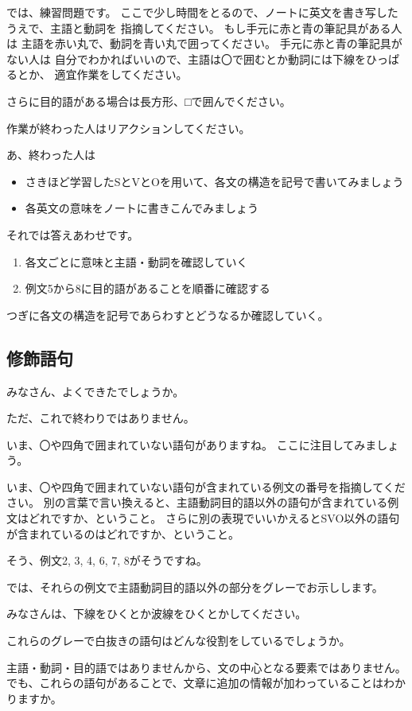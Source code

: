 \documentclass[book,jafontscale=0.9247]{jlreq}
\begin{document}
では、練習問題です。
ここで少し時間をとるので、ノートに英文を書き写したうえで、主語と動詞を
指摘してください。
もし手元に赤と青の筆記具がある人は
主語を赤い丸で、動詞を青い丸で囲ってください。
手元に赤と青の筆記具がない人は
自分でわかればいいので、主語は〇で囲むとか動詞には下線をひっぱるとか、
適宜作業をしてください。

さらに目的語がある場合は長方形、□で囲んでください。

作業が終わった人はリアクションしてください。


あ、終わった人は
\begin{itemize}
 \item さきほど学習したSとVとOを用いて、各文の構造を記号で書いてみましょう
 \item 各英文の意味をノートに書きこんでみましょう
\end{itemize}


それでは答えあわせです。

\begin{enumerate}
 \item 各文ごとに意味と主語・動詞を確認していく
 \item 例文5から8に目的語があることを順番に確認する
\end{enumerate}

つぎに各文の構造を記号であらわすとどうなるか確認していく。

\subsection{修飾語句}
みなさん、よくできたでしょうか。

ただ、これで終わりではありません。

いま、〇や四角で囲まれていない語句がありますね。
ここに注目してみましょう。

いま、〇や四角で囲まれていない語句が含まれている例文の番号を指摘してください。
別の言葉で言い換えると、主語動詞目的語以外の語句が含まれている例文はどれですか、ということ。
さらに別の表現でいいかえるとSVO以外の語句が含まれているのはどれですか、ということ。

そう、例文2, 3, 4, 6, 7, 8がそうですね。

では、それらの例文で主語動詞目的語以外の部分をグレーでお示しします。

みなさんは、下線をひくとか波線をひくとかしてください。

これらのグレーで白抜きの語句はどんな役割をしているでしょうか。

主語・動詞・目的語ではありませんから、文の中心となる要素ではありません。
でも、これらの語句があることで、文章に追加の情報が加わっていることはわかりますか。
\end{document}

